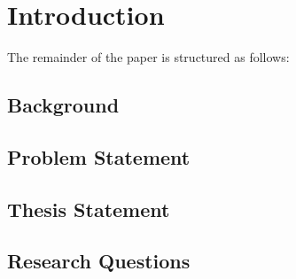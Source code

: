\chapter{Introduction}\label{chap:intro}
The remainder of the paper is structured as follows:
\section{Background}\label{sec:background}

\section{Problem Statement}\label{sec:problem-statement}

\section{Thesis Statement}\label{sec:thesis-statement}

\section{Research Questions}\label{sec:research-questions}
